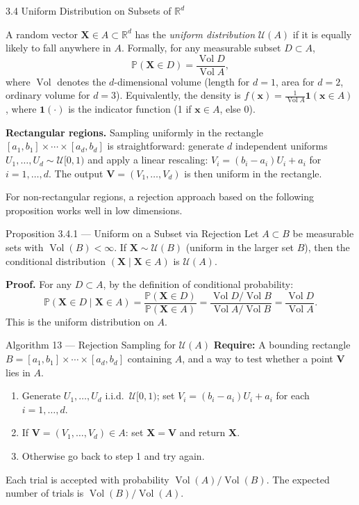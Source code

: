 \documentclass[aspectratio=169,10pt]{beamer}
\newcommand{\PP}{\mathbb{P}}
\newcommand{\RR}{\mathbb{R}}
\newcommand{\UU}{\mathcal{U}}
\DeclareMathOperator{\Vol}{Vol}
\begin{document}
\begin{frame}[allowframebreaks]{3.4 Uniform Distribution on Subsets of $\RR^d$}

A random vector $\mathbf{X} \in A \subset \RR^d$ has the \emph{uniform distribution}
$\UU(A)$ if it is equally likely to fall anywhere in $A$.  Formally, for any
measurable subset $D \subset A$,
\[
  \PP(\mathbf{X} \in D) = \frac{\Vol D}{\Vol A},
\]
where $\Vol$ denotes the $d$-dimensional volume (length for $d=1$, area for $d=2$,
ordinary volume for $d=3$).  Equivalently, the density is
$f(\mathbf{x}) = \frac{1}{\Vol A}\mathbf{1}(\mathbf{x} \in A)$,
where $\mathbf{1}(\cdot)$ is the indicator function (1 if $\mathbf{x} \in A$, else 0).

\textbf{Rectangular regions.}  Sampling uniformly in the rectangle
$[a_1,b_1] \times \cdots \times [a_d,b_d]$ is straightforward:
generate $d$ independent uniforms $U_1, \ldots, U_d \sim \UU[0,1)$ and apply
a linear rescaling: $V_i = (b_i - a_i)U_i + a_i$ for $i = 1, \ldots, d$.
The output $\mathbf{V} = (V_1, \ldots, V_d)$ is then uniform in the rectangle.

For non-rectangular regions, a rejection approach based on the following
proposition works well in low dimensions.

\begin{block}{Proposition 3.4.1 --- Uniform on a Subset via Rejection}
  Let $A \subset B$ be measurable sets with $\Vol(B) < \infty$.
  If $\mathbf{X} \sim \UU(B)$ (uniform in the larger set $B$), then the
  conditional distribution $(\mathbf{X} \mid \mathbf{X} \in A)$ is $\UU(A)$.
\end{block}

\textbf{Proof.}  For any $D \subset A$, by the definition of conditional probability:
\[
  \PP(\mathbf{X} \in D \mid \mathbf{X} \in A)
  = \frac{\PP(\mathbf{X} \in D)}{\PP(\mathbf{X} \in A)}
  = \frac{\Vol D / \Vol B}{\Vol A / \Vol B}
  = \frac{\Vol D}{\Vol A}.
\]
This is the uniform distribution on $A$.

\framebreak

\begin{alertblock}{Algorithm 13 --- Rejection Sampling for $\UU(A)$}
  \textbf{Require:} A bounding rectangle $B = [a_1,b_1] \times \cdots \times [a_d,b_d]$
  containing $A$, and a way to test whether a point $\mathbf{V}$ lies in $A$.
  \begin{enumerate}
    \item Generate $U_1, \ldots, U_d$ i.i.d.\ $\UU[0,1)$; set
          $V_i = (b_i - a_i)U_i + a_i$ for each $i = 1, \ldots, d$.
    \item If $\mathbf{V} = (V_1, \ldots, V_d) \in A$: set $\mathbf{X} = \mathbf{V}$
          and return $\mathbf{X}$.
    \item Otherwise go back to step 1 and try again.
  \end{enumerate}
  Each trial is accepted with probability $\Vol(A)/\Vol(B)$.
  The expected number of trials is $\Vol(B)/\Vol(A)$.
\end{alertblock}


\end{frame}
\end{document}
